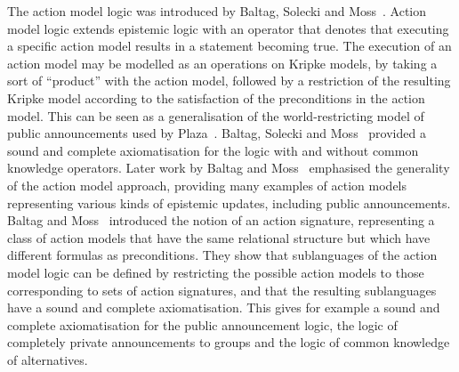The action model logic was introduced by Baltag, Solecki and Moss~\cite{baltag:1998, baltag:1999}.
Action model logic extends epistemic logic with an operator that denotes that executing a specific action model results in a statement becoming true.
The execution of an action model may be modelled as an operations on Kripke models, by taking a sort of ``product'' with the action model, followed by a restriction of the resulting Kripke model according to the satisfaction of the preconditions in the action model.
This can be seen as a generalisation of the world-restricting model of public announcements used by Plaza~\cite{plaza:1989}.
Baltag, Solecki and Moss~\cite{baltag:1998} provided a sound and complete axiomatisation for the logic with and without common knowledge operators.
Later work by Baltag and Moss~\cite{baltag:2004} emphasised the generality of the action model approach, providing many examples of action models representing various kinds of epistemic updates, including public announcements.
Baltag and Moss~\cite{baltag:2004} introduced the notion of an action signature, representing a class of action models that have the same relational structure but which have different formulas as preconditions.
They show that sublanguages of the action model logic can be defined by restricting the possible action models to those corresponding to sets of action signatures, and that the resulting sublanguages have a sound and complete axiomatisation.
This gives for example a sound and complete axiomatisation for the public announcement logic, the logic of completely private announcements to groups and the logic of common knowledge of alternatives.

